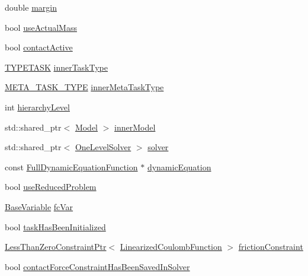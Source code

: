\begin{DoxyCompactItemize}
\item 
double \hyperlink{structocra_1_1Task_1_1Pimpl_a8e92bd559918e4b01bcd235ad9e40a3a}{margin}
\item 
bool \hyperlink{structocra_1_1Task_1_1Pimpl_a33e37d9266902694f72be09c4c5db430}{use\+Actual\+Mass}
\item 
bool \hyperlink{structocra_1_1Task_1_1Pimpl_acf9fa37d987169c93362d793335e1cac}{contact\+Active}
\item 
\hyperlink{classocra_1_1Task_ad9d224cf787aa61c098f282efb78254a}{T\+Y\+P\+E\+T\+A\+SK} \hyperlink{structocra_1_1Task_1_1Pimpl_a576a2ffd53c10013b395d3430fe487ed}{inner\+Task\+Type}
\item 
\hyperlink{classocra_1_1Task_a8ddf2840d178ca273e886c9ca95248fe}{M\+E\+T\+A\+\_\+\+T\+A\+S\+K\+\_\+\+T\+Y\+PE} \hyperlink{structocra_1_1Task_1_1Pimpl_a74f9aa5427e6161018203a9e75da3bf4}{inner\+Meta\+Task\+Type}
\item 
int \hyperlink{structocra_1_1Task_1_1Pimpl_a16b28bba8d6425b4bc7375297dd2cd47}{hierarchy\+Level}
\item 
std\+::shared\+\_\+ptr$<$ \hyperlink{classocra_1_1Model}{Model} $>$ \hyperlink{structocra_1_1Task_1_1Pimpl_a6a98b6fb3efab282ba6d5092245b36d1}{inner\+Model}
\item 
std\+::shared\+\_\+ptr$<$ \hyperlink{classocra_1_1OneLevelSolver}{One\+Level\+Solver} $>$ \hyperlink{structocra_1_1Task_1_1Pimpl_af1e09ed90ae5dee85e7fb5bd9d959df7}{solver}
\item 
const \hyperlink{classocra_1_1FullDynamicEquationFunction}{Full\+Dynamic\+Equation\+Function} $\ast$ \hyperlink{structocra_1_1Task_1_1Pimpl_ae0ea7e23e7027d49ab4f7b9e4bac4e77}{dynamic\+Equation}
\item 
bool \hyperlink{structocra_1_1Task_1_1Pimpl_a3212017ae655edc8559498c773f0285f}{use\+Reduced\+Problem}
\item 
\hyperlink{classocra_1_1BaseVariable}{Base\+Variable} \hyperlink{structocra_1_1Task_1_1Pimpl_ae95e699c5e631e1ec4e6d887b800f322}{fc\+Var}
\item 
bool \hyperlink{structocra_1_1Task_1_1Pimpl_a40e20271ee922933345e452f26569ac1}{task\+Has\+Been\+Initialized}
\item 
\hyperlink{classocra_1_1LessThanZeroConstraintPtr}{Less\+Than\+Zero\+Constraint\+Ptr}$<$ \hyperlink{classocra_1_1LinearizedCoulombFunction}{Linearized\+Coulomb\+Function} $>$ \hyperlink{structocra_1_1Task_1_1Pimpl_a311170ea86291b3d4fe9b9f1cd40e0a8}{friction\+Constraint}
\item 
bool \hyperlink{structocra_1_1Task_1_1Pimpl_abcedfdc974f594cd0c583c2e25eda984}{contact\+Force\+Constraint\+Has\+Been\+Saved\+In\+Solver}

\end{DoxyCompactItemize}
